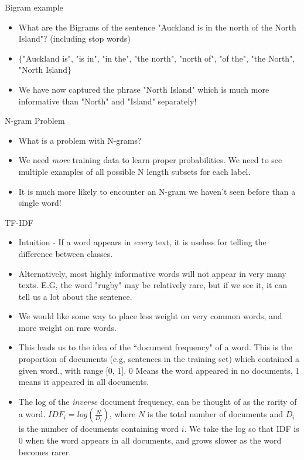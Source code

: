\documentclass[aspectratio=169, 10pt]{beamer}
\begin{document}
\begin{frame}{Bigram example}
\begin{itemize}
    \item What are the Bigrams of the sentence "Auckland is in the north of the North Island"? (including stop words)
    \pause
    \item $\{$"Auckland is", "is in", "in the", "the north", "north of", "of the", "the North", "North Island$\}$
    \item We have now captured the phrase "North Island" which is much more informative than "North" and "Island" separately!
\end{itemize}
\end{frame}

\begin{frame}{N-gram Problem}
\begin{itemize}
    \item What is a problem with N-grams?
    \pause
    \item We need \textit{more} training data to learn proper probabilities. We need to see multiple examples of all possible N length subsets for each label.
    \item It is much more likely to encounter an N-gram we haven't seen before than a single word!
\end{itemize}
\end{frame}

\begin{frame}{TF-IDF}
    \begin{itemize}
        \item Intuition - If a word appears in \textit{every} text, it is useless for telling the difference between classes.
        \item Alternatively, most highly informative words will not appear in very many texts. E.G, the word "rugby" may be relatively rare, but if we see it, it can tell us a lot about the sentence.
        \item We would like some way to place less weight on very common words, and more weight on rare words.
        \item This leads us to the idea of the ``document frequency" of a word. This is the proportion of documents (e.g, sentences in the training set) which contained a given word., with range [0, 1]. 0 Means the word appeared in no documents, 1 means it appeared in all documents.
        \item The log of the \textit{inverse} document frequency, can be thought of as the rarity of a word. $IDF_i = log(\frac{N}{D_i})$, where $N$ is the total number of documents and $D_i$ is the number of documents containing word $i$. We take the log so that IDF is 0 when the word appears in all documents, and grows slower as the word becomes rarer.
    \end{itemize}
\end{frame}
\end{document}
